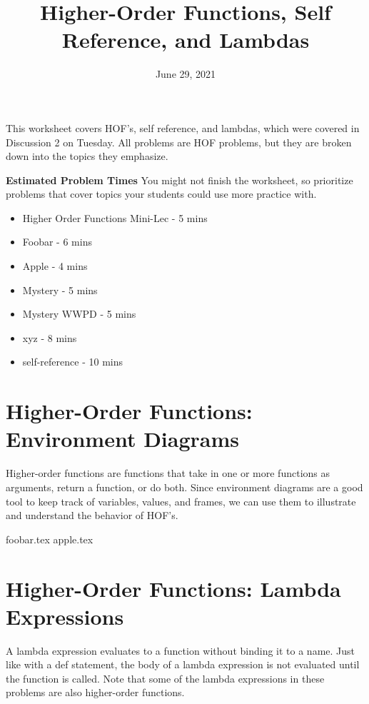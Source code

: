 \documentclass{exam}
\title{Higher-Order Functions, Self Reference, and Lambdas}
\date{June 29, 2021}
\begin{document}
\maketitle


\begin{blocksection}
\begin{guide}

This worksheet covers HOF's, self reference, and lambdas, which were covered in Discussion 2 on Tuesday. 
All problems are HOF problems, but they are broken down into the topics they emphasize.

\textbf{Estimated Problem Times}
\newline
You might not finish the worksheet, so prioritize problems that cover topics your students could use more practice with.
\begin{itemize}
    \item Higher Order Functions Mini-Lec - 5 mins
    \item Foobar - 6 mins
    \item Apple - 4 mins
    \item Mystery - 5 mins
    \item Mystery WWPD - 5 mins
    \item xyz - 8 mins
    \item self-reference - 10 mins
\end{itemize}
\end{guide}
\end{blocksection}


\section{Higher-Order Functions: Environment Diagrams}
Higher-order functions are functions that take in one or more functions as arguments, return a function, or do both. 
Since environment diagrams are a good tool to keep track of variables, values, and frames, we can use them to illustrate and 
understand the behavior of HOF's.
\begin{questions}
{foobar.tex}
{apple.tex}
\end{questions}

\newpage
\section{Higher-Order Functions: Lambda Expressions}
A lambda expression evaluates to a function without binding it to a name. Just like with a def statement, the body 
of a lambda expression is not evaluated until the function is called. Note that some of the lambda expressions in these problems 
are also higher-order functions.
\end{document}
